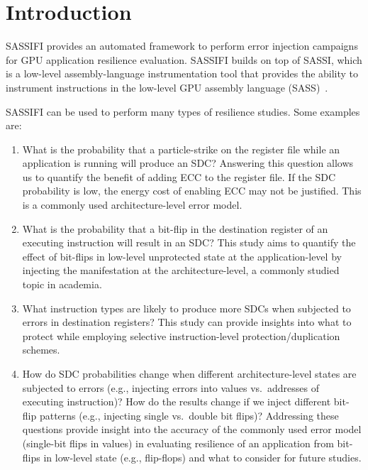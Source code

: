 \section{Introduction}
\label{sec:intro}

SASSIFI provides an automated framework to perform error injection campaigns
for GPU application resilience evaluation.  SASSIFI builds on top of SASSI,
which is a low-level assembly-language instrumentation tool  that provides the
ability to instrument instructions in the low-level GPU assembly language
(SASS)~\cite{SASSI_ISCA}.

SASSIFI can be used to perform many types of resilience studies. Some examples
are:

\begin{enumerate}

	\item What is the probability that a particle-strike on the
		register file while an application is running will produce an
		SDC? Answering this question allows us to quantify the benefit
		of adding ECC to the register file.  If the SDC probability is
		low, the energy cost of enabling ECC may not be justified. 
		This is a commonly used architecture-level error model.

	\item What is the probability that a bit-flip in the destination
		register of an executing instruction will result in an SDC?  This study
		aims to quantify the effect of bit-flips in low-level unprotected state at
		the application-level by injecting the manifestation at the
		architecture-level, a commonly studied topic in academia.

	\item What instruction types are likely to produce more SDCs when
		subjected to errors in destination registers? This study can provide 
		insights into what to protect while employing selective
		instruction-level protection/duplication schemes.

	\item How do SDC probabilities change when different architecture-level
		states are subjected to errors (e.g., injecting errors into
		values vs.\ addresses of executing instruction)?  How do the
		results change if we inject different bit-flip patterns (e.g.,
		injecting single vs.\ double bit flips)?  Addressing these
		questions provide insight into the accuracy of the commonly
		used error model (single-bit flips in values) in evaluating
		resilience of an application from bit-flips in low-level state
		(e.g., flip-flops) and what to consider for future studies.

\end{enumerate}

